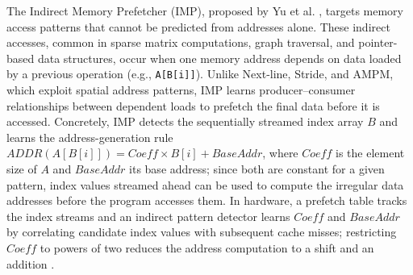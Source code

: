 \documentclass[12pt, letterpaper]{article}
\begin{document}
\noindent The Indirect Memory Prefetcher (IMP), proposed by Yu et al. \cite{yu-micro-15}, targets memory access patterns that cannot be predicted from addresses alone. These indirect accesses, common in sparse matrix computations, graph traversal, and pointer-based data structures, occur when one memory address depends on data loaded by a previous operation (e.g., \texttt{A[B[i]]}). Unlike Next-line, Stride, and AMPM, which exploit spatial address patterns, IMP learns producer--consumer relationships between dependent loads to prefetch the final data before it is accessed. Concretely, IMP detects the sequentially streamed index array $B$ and learns the address-generation rule $ADDR(A[B[i]]) = Coeff \times B[i] + BaseAddr$, where $Coeff$ is the element size of $A$ and $BaseAddr$ its base address; since both are constant for a given pattern, index values streamed ahead can be used to compute the irregular data addresses before the program accesses them. In hardware, a prefetch table tracks the index streams and an indirect pattern detector learns $Coeff$ and $BaseAddr$ by correlating candidate index values with subsequent cache misses; restricting $Coeff$ to powers of two reduces the address computation to a shift and an addition \cite{yu-micro-15}.

\end{document}

